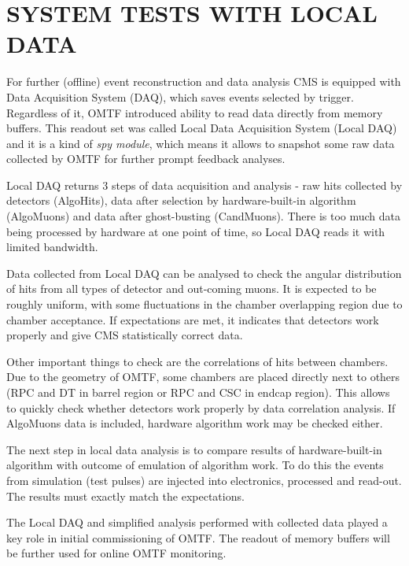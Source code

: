 \section{SYSTEM TESTS WITH LOCAL DATA}

For further (offline) event reconstruction and data analysis CMS is 
equipped with Data Acquisition
System (DAQ), which saves events selected by trigger. Regardless of
it, OMTF introduced ability to read data directly from memory buffers.
This readout set was called Local Data Acquisition System (Local DAQ)
and it is a kind of \textit{spy module}, which means it allows to snapshot
some raw data collected by OMTF  for further prompt feedback analyses.

Local DAQ returns 3 steps of data acquisition and analysis - raw hits
collected by detectors (AlgoHits), data after selection by hardware-built-in
algorithm (AlgoMuons) and data after ghost-busting (CandMuons). There
is too much data being processed by hardware at one point of time,
so Local DAQ reads it with limited bandwidth.

Data collected from Local DAQ can be analysed to check the angular distribution
of hits from all types of detector and out-coming muons. 
It is expected to be roughly uniform, with some
fluctuations in the chamber overlapping region due to chamber acceptance. 
If expectations are
met, it indicates that detectors work properly and give CMS statistically
correct data.

Other important things to check are the correlations of hits between chambers.
Due to the geometry of OMTF, some chambers are placed directly next to
others (RPC and DT in barrel region or RPC and CSC in endcap region).
This allows to quickly check whether detectors work properly by data correlation
analysis. If AlgoMuons data is included, hardware algorithm work may
be checked either.

The next step in local data analysis is to compare results of hardware-built-in
algorithm with outcome of emulation of algorithm work. To do this the events
from simulation (test pulses) are injected into electronics, processed and
read-out. The results must exactly match the expectations.

The Local DAQ and simplified analysis performed with collected data played 
a key role in initial commissioning of OMTF. The readout of memory buffers 
will be further used for online OMTF monitoring.
